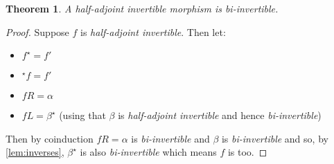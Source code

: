 \documentclass{article}
\newtheorem{theorem}{Theorem}
\theoremstyle{definition}
\theoremstyle{examplestyle}
\newcommand{\linv}[1]{{}^\star\!#1}
\newcommand{\rinv}[1]{#1^\star}
\begin{document}
\begin{theorem}
  A \emph{half-adjoint invertible} morphism is \emph{bi-invertible}.
\end{theorem}
\begin{proof}
  Suppose \(f\) is \emph{half-adjoint invertible}. Then let:
  \begin{itemize}
  \item \(\rinv f = {f'}\)
  \item \(\linv f = {f'}\)
  \item \(fR = \alpha\)
  \item \(fL = \rinv \beta\) (using that \(\beta\) is \emph{half-adjoint invertible} and hence \emph{bi-invertible})
  \end{itemize}
  Then by coinduction \(fR = \alpha\) is \emph{bi-invertible} and \(\beta\) is \emph{bi-invertible} and so, by \cref{lem:inverses}, \(\rinv \beta\) is also \emph{bi-invertible} which means \(f\) is too.
\end{proof}
\end{document}
